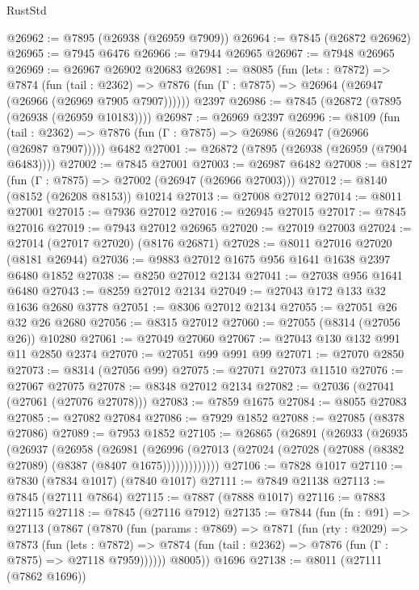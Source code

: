 \begin{lexlean}{RustStd}
\begin{coremodule}
@26962 := @7895 (@26938 (@26959 @7909))
@26964 := @7845 (@26872 @26962)
@26965 := @7945 @6476
@26966 := @7944 @26965
@26967 := @7948 @26965
@26969 := @26967 @26902 @20683
@26981 := @8085
    (fun (lets : @7872) =>
    @7874
      (fun (tail : @2362) =>
      @7876 (fun (Γ : @7875) => @26964 (@26947 (@26966 (@26969 @7905 @7907))))))
    @2397
@26986 := @7845 (@26872 (@7895 (@26938 (@26959 @10183))))
@26987 := @26969 @2397
@26996 := @8109
    (fun (tail : @2362) => @7876 (fun (Γ : @7875) => @26986 (@26947 (@26966 (@26987 @7907)))))
    @6482
@27001 := @26872 (@7895 (@26938 (@26959 (@7904 @6483))))
@27002 := @7845 @27001
@27003 := @26987 @6482
@27008 := @8127 (fun (Γ : @7875) => @27002 (@26947 (@26966 @27003)))
@27012 := @8140 (@8152 (@26208 @8153)) @10214
@27013 := @27008 @27012
@27014 := @8011 @27001
@27015 := @7936 @27012
@27016 := @26945 @27015
@27017 := @7845 @27016
@27019 := @7943 @27012 @26965
@27020 := @27019 @27003
@27024 := @27014 (@27017 @27020) (@8176 @26871)
@27028 := @8011 @27016 @27020 (@8181 @26944)
@27036 := @9883 @27012 @1675 @956 @1641 @1638 @2397 @6480 @1852
@27038 := @8250 @27012 @2134
@27041 := @27038 @956 @1641 @6480
@27043 := @8259 @27012 @2134
@27049 := @27043 @172 @133 @32 @1636 @2680 @3778
@27051 := @8306 @27012 @2134
@27055 := @27051 @26 @32 @26 @2680
@27056 := @8315 @27012
@27060 := @27055 (@8314 (@27056 @26)) @10280
@27061 := @27049 @27060
@27067 := @27043 @130 @132 @991 @11 @2850 @2374
@27070 := @27051 @99 @991 @99
@27071 := @27070 @2850
@27073 := @8314 (@27056 @99)
@27075 := @27071 @27073 @11510
@27076 := @27067 @27075
@27078 := @8348 @27012 @2134
@27082 := @27036 (@27041 (@27061 (@27076 @27078)))
@27083 := @7859 @1675
@27084 := @8055 @27083
@27085 := @27082 @27084
@27086 := @7929 @1852
@27088 := @27085 (@8378 @27086)
@27089 := @7953 @1852
@27105 := @26865
    (@26891
      (@26933
        (@26935
          (@26937
            (@26958
              (@26981
                (@26996
                  (@27013 (@27024 (@27028 (@27088 (@8382 @27089) (@8387 (@8407 @1675)))))))))))))
@27106 := @7828 @1017
@27110 := @7830 (@7834 @1017) (@7840 @1017)
@27111 := @7849 @21138
@27113 := @7845 (@27111 @7864)
@27115 := @7887 (@7888 @1017)
@27116 := @7883 @27115
@27118 := @7845 (@27116 @7912)
@27135 := @7844
    (fun (fn : @91) =>
    @27113
      (@7867
        (@7870
          (fun (params : @7869) =>
          @7871
            (fun (rty : @2029) =>
            @7873
              (fun (lets : @7872) =>
              @7874 (fun (tail : @2362) => @7876 (fun (Γ : @7875) => @27118 @7959))))))
        @8005))
    @1696
@27138 := @8011 (@27111 (@7862 @1696))

\end{coremodule}
\end{lexlean}
